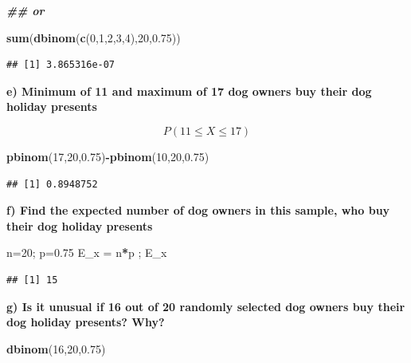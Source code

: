 \documentclass[
]{book}
\newenvironment{Shaded}{\begin{snugshade}}{\end{snugshade}}
\newcommand{\DecValTok}[1]{\textcolor[rgb]{0.00,0.00,0.81}{#1}}
\newcommand{\DocumentationTok}[1]{\textcolor[rgb]{0.56,0.35,0.01}{\textbf{\textit{#1}}}}
\newcommand{\FloatTok}[1]{\textcolor[rgb]{0.00,0.00,0.81}{#1}}
\newcommand{\FunctionTok}[1]{\textcolor[rgb]{0.13,0.29,0.53}{\textbf{#1}}}
\newcommand{\NormalTok}[1]{#1}
\newcommand{\OtherTok}[1]{\textcolor[rgb]{0.56,0.35,0.01}{#1}}
\newcommand{\SpecialCharTok}[1]{\textcolor[rgb]{0.81,0.36,0.00}{\textbf{#1}}}
\begin{document}
\begin{Shaded}
\begin{Highlighting}[]
\DocumentationTok{\#\# or}

\FunctionTok{sum}\NormalTok{(}\FunctionTok{dbinom}\NormalTok{(}\FunctionTok{c}\NormalTok{(}\DecValTok{0}\NormalTok{,}\DecValTok{1}\NormalTok{,}\DecValTok{2}\NormalTok{,}\DecValTok{3}\NormalTok{,}\DecValTok{4}\NormalTok{),}\DecValTok{20}\NormalTok{,}\FloatTok{0.75}\NormalTok{))}
\end{Highlighting}
\end{Shaded}

\begin{verbatim}
## [1] 3.865316e-07
\end{verbatim}

\textbf{e) Minimum of 11 and maximum of 17 dog owners buy their dog holiday presents}

\[P(11 \le X \le 17)\]

\begin{Shaded}
\begin{Highlighting}[]
\FunctionTok{pbinom}\NormalTok{(}\DecValTok{17}\NormalTok{,}\DecValTok{20}\NormalTok{,}\FloatTok{0.75}\NormalTok{)}\SpecialCharTok{{-}}\FunctionTok{pbinom}\NormalTok{(}\DecValTok{10}\NormalTok{,}\DecValTok{20}\NormalTok{,}\FloatTok{0.75}\NormalTok{)}
\end{Highlighting}
\end{Shaded}

\begin{verbatim}
## [1] 0.8948752
\end{verbatim}

\textbf{f) Find the expected number of dog owners in this sample, who buy their dog holiday presents}

\begin{Shaded}
\begin{Highlighting}[]
\NormalTok{n}\OtherTok{=}\DecValTok{20}\NormalTok{; p}\OtherTok{=}\FloatTok{0.75}
\NormalTok{E\_x }\OtherTok{=}\NormalTok{ n}\SpecialCharTok{*}\NormalTok{p ; }
\NormalTok{E\_x}
\end{Highlighting}
\end{Shaded}

\begin{verbatim}
## [1] 15
\end{verbatim}

\textbf{g) Is it unusual if 16 out of 20 randomly selected dog owners buy their dog holiday presents? Why?}

\begin{Shaded}
\begin{Highlighting}[]
\FunctionTok{dbinom}\NormalTok{(}\DecValTok{16}\NormalTok{,}\DecValTok{20}\NormalTok{,}\FloatTok{0.75}\NormalTok{)}
\end{Highlighting}
\end{Shaded}
\end{document}

